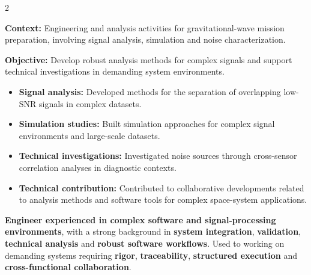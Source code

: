 \documentclass[8pt,a4paper,ragged2e,withhyper]{../_shared/altacv}
\begin{document}
\begin{paracol}{2}
\divider


\textbf{Context:} Engineering and analysis activities for gravitational-wave mission preparation, involving signal analysis, simulation and noise characterization.

\textbf{Objective:} Develop robust analysis methods for complex signals and support technical investigations in demanding system environments.

\begin{itemize}
\item \textbf{Signal analysis:} Developed methods for the separation of overlapping low-SNR signals in complex datasets.
\item \textbf{Simulation studies:} Built simulation approaches for complex signal environments and large-scale datasets.
\item \textbf{Technical investigations:} Investigated noise sources through cross-sensor correlation analyses in diagnostic contexts.
\item \textbf{Technical contribution:} Contributed to collaborative developments related to analysis methods and software tools for complex space-system applications.
\end{itemize}




\switchcolumn

\textbf{Engineer experienced in complex software and signal-processing environments}, with a strong background in \textbf{system integration}, \textbf{validation}, \textbf{technical analysis} and \textbf{robust software workflows}. Used to working on demanding systems requiring \textbf{rigor}, \textbf{traceability}, \textbf{structured execution} and \textbf{cross-functional collaboration}.


\end{paracol}
\end{document}

